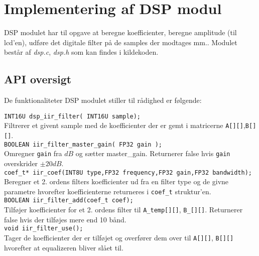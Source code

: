 \section{Implementering af DSP modul}\label{sec:implementering_dsp}
DSP modulet har til opgave at beregne koefficienter, beregne amplitude (til lcd'en), udføre det 
digitale filter på de samples der modtages mm.. 
Modulet består af \textit{dsp.c}, \textit{dsp.h} som kan findes i kildekoden.

%


\subsection{API oversigt}
De funktionaliteter DSP modulet stiller til rådighed er følgende:

\texttt{INT16U dsp\_iir\_filter( INT16U sample);}\\
Filtrerer et givent sample med de koefficienter der er gemt i matricerne \texttt{A[][]},\texttt{B[][]}.\\

\texttt{BOOLEAN iir\_filter\_master\_gain( FP32 gain ); }\\
Omregner \texttt{gain} fra $dB$ og sætter master\_gain. Returnerer false hvis \texttt{gain} overskrider $\pm 20dB$.\\

\texttt{coef\_t* iir\_coef(INT8U type,FP32 frequency,FP32 gain,FP32 bandwidth);}\\
Beregner et 2. ordens filters koefficienter ud fra en filter type og de givne parametre hvorefter koefficienterne returneres i \texttt{coef\_t} struktur'en.\\

\texttt{BOOLEAN iir\_filter\_add(coef\_t coef);}\\
Tilføjer koefficienter for et 2. ordens filter til \texttt{A\_temp[][]}, \texttt{B\_[][]}. Returnerer false hvis der tilføjes mere end 10 bånd.\\

\texttt{void iir\_filter\_use();} \\
Tager de koefficienter der er tilføjet og overfører dem over til \texttt{A[][]}, \texttt{B[][]} hvorefter at equalizeren bliver slået til.\\

